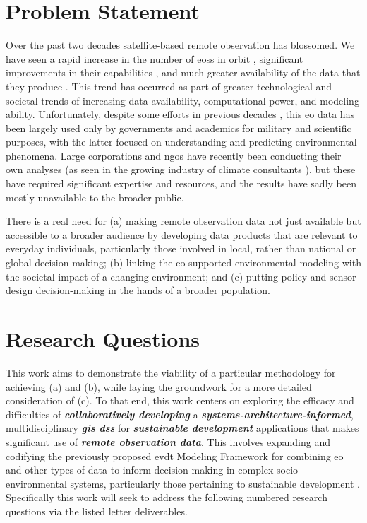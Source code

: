 \documentclass[notitlepage]{article}
\begin{document}
\newpage


\section{Problem Statement}

Over the past two decades satellite-based remote observation has blossomed. We have seen a rapid increase in the number of \acp{eos} in orbit \cite{belwardWhoLaunchedWhat2015}, significant improvements in their capabilities \cite{jensenRemoteSensingEnvironment2006}, and much greater availability of the data that they produce \cite{borowitzOpenSpaceGlobal2017}. This trend has occurred as part of greater technological and societal trends of increasing data availability, computational power, and modeling ability. Unfortunately, despite some efforts in previous decades \cite{lightWarfareWelfareDefense2005}, this \ac{eo} data has been largely used only by governments and academics for military and scientific purposes, with the latter focused on understanding and predicting environmental phenomena. Large corporations and \acp{ngo} have recently been conducting their own analyses (as seen in the growing industry of climate consultants \cite{cohenTop10Climate2011}), but these have required significant expertise and resources, and the results have sadly been mostly unavailable to the broader public. 

There is a real need for (a) making remote observation data not just available but accessible to a broader audience by developing data products that are relevant to everyday individuals, particularly those involved in local, rather than national or global decision-making; (b) linking the \ac{eo}-supported environmental modeling with the societal impact of a changing environment; and (c) putting policy and sensor design decision-making in the hands of a broader population. 

\section{Research Questions} \label{sec:questions}

This work aims to demonstrate the viability of a particular methodology for achieving (a) and (b), while laying the groundwork for a more detailed consideration of (c). To that end, this work centers on exploring the efficacy and difficulties of \textbf{\textit{collaboratively developing}} a \textbf{\textit{systems-architecture-informed}}, multidisciplinary \textbf{\textit{\ac{gis} \ac{dss}}} for \textbf{\textit{sustainable development}} applications that makes significant use of \textbf{\textit{remote observation data}}. This involves expanding and codifying the previously proposed \ac{evdt} Modeling Framework  for combining \ac{eo} and other types of data to inform decision-making in complex socio-environmental systems, particularly those pertaining to sustainable development \cite{reidCombiningSocialEnvironmental2019}. Specifically this work will seek to address the following numbered research questions via the listed letter deliverables.
\end{document}
